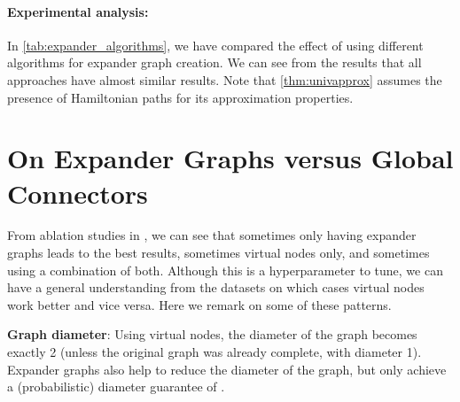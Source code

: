 \documentclass{article}
\theoremstyle{plain}
\theoremstyle{definition}
\theoremstyle{remark}
\begin{document}
\paragraph{Experimental analysis:} In \cref{tab:expander_algorithms}, we have compared the effect of using different algorithms for expander graph creation. We can see from the results that all approaches have almost similar results. Note that \cref{thm:univapprox} assumes the presence of Hamiltonian paths for its approximation properties.



\begin{table}
\centering
{}
\label{tab:expander_algorithms}
\caption{An experimental comparison of different approaches used for Ramanujan Expander graph generation.}
\end{table}

\section{On Expander Graphs versus Global Connectors} \label{sec:expander-vs-global}
From ablation studies in , we can see that sometimes only having expander graphs leads to the best results, sometimes virtual nodes only, and sometimes using a combination of both. Although this is a hyperparameter to tune, we can have a general understanding from the datasets on which cases virtual nodes work better and vice versa. Here we remark on some of these patterns.

\textbf{Graph diameter}: Using virtual nodes, the diameter of the graph becomes exactly 2 (unless the original graph was already complete, with diameter 1). Expander graphs also help to reduce the diameter of the graph, but only achieve a (probabilistic) diameter guarantee of .
\end{document}
